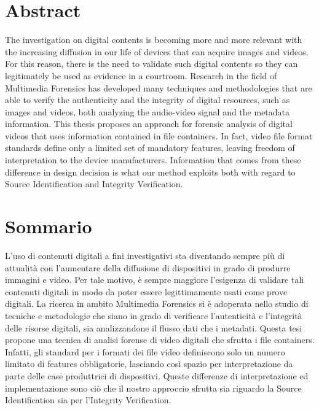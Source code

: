 \chapter*{Abstract}

The investigation on digital contents is becoming more and more relevant with the increasing diffusion in our life of devices that can acquire images and videos. For this reason, there is the need to validate such digital contents so they can legitimately be used as evidence in a courtroom.
Research in the field of Multimedia Forensics has developed many techniques and methodologies that are able to verify the authenticity and the integrity of digital resources, such as images and videos, both analyzing the audio-video signal and the metadata information.
This thesis proposes an approach for forensic analysis of digital videos that uses information contained in file containers. In fact, video file format standards define only a limited set of mandatory features, leaving freedom of interpretation to the device manufacturers.
Information that comes from these difference in design decision is what our method exploits both with regard to Source Identification and Integrity Verification.

\chapter*{Sommario}

L'uso di contenuti digitali a fini investigativi sta diventando sempre più di attualità con l'aumentare della diffusione di dispositivi in grado di produrre immagini e video. Per tale motivo, è sempre maggiore l'esigenza di validare tali contenuti digitali in modo da poter essere legittimamente usati come prove digitali.
La ricerca in ambito Multimedia Forensics si è adoperata nello studio di tecniche e metodologie che siano in grado di verificare l'autenticità e l'integrità delle risorse digitali, sia analizzandone il flusso dati che i metadati. 
Questa tesi propone una tecnica di analisi forense di video digitali che sfrutta i file containers. Infatti, gli standard per i formati dei file video definiscono solo un numero limitato di features obbligatorie, lasciando così spazio per interpretazione da parte delle case produttrici di dispositivi. Queste differenze di interpretazione ed implementazione sono ciò che il nostro approccio sfrutta sia riguardo la Source Identification sia per l'Integrity Verification.